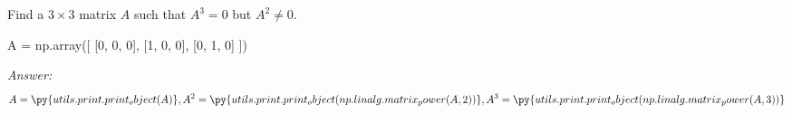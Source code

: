 \documentclass[letterpaper]{article}
\newcommand{\ans}{\textit{Answer: }}
\newenvironment{question}[2][Question]{\begin{trivlist}
\item[\hskip \labelsep {\bfseries #1}\hskip \labelsep {\bfseries #2.}]}{\end{trivlist}}
\newcommand{\printobj}[1]{\py{utils.print.print_object(#1)}}
\begin{document}
\begin{question}{3.49}
    Find a $3 \times 3$ matrix $A$ such that $A ^ { 3 } = 0$ but $A ^ { 2 } \neq 0 .$

\begin{pycode}
A = np.array([
    [0, 0, 0],
    [1, 0, 0],
    [0, 1, 0]
])
\end{pycode}

    \ans 
    \begin{gather*}
        A = \printobj{A}, 
        A^2 = \printobj{np.linalg.matrix_power(A, 2)},
        A^3 = \printobj{np.linalg.matrix_power(A, 3)}
    \end{gather*}

\end{question}
\end{document}
